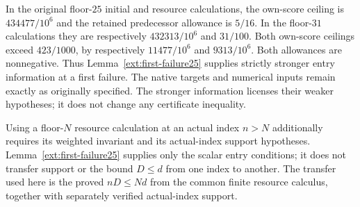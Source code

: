 In the original floor-$25$ initial and resource calculations, the own-score
ceiling is $434477/10^6$ and the retained predecessor allowance is $5/16$.
In the floor-$31$ calculations they are respectively $432313/10^6$ and
$31/100$. Both own-score ceilings exceed $423/1000$, by respectively
$11477/10^6$ and $9313/10^6$. Both allowances are nonnegative.
Thus Lemma~\ref{ext:first-failure25} supplies strictly stronger entry
information at a first failure. The native targets and numerical inputs
remain exactly as originally specified. The stronger information licenses
their weaker hypotheses; it does not change any certificate inequality.

Using a floor-$N$ resource calculation at an actual index $n>N$ additionally
requires its weighted invariant and its actual-index support hypotheses.
Lemma~\ref{ext:first-failure25} supplies only the scalar entry conditions;
it does not transfer support or the bound $D\le d$ from one index to another.
The transfer used here is the proved $nD\le Nd$ from the common finite
resource calculus, together with separately verified actual-index support.
